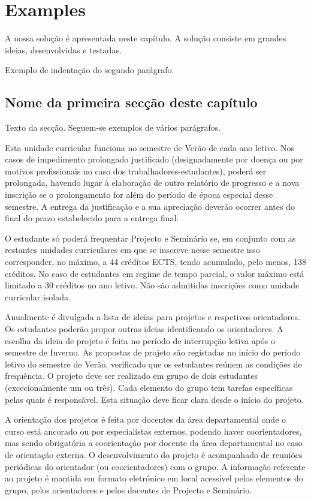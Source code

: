 \chapter{Examples}\label{ch:examples}

A nossa solução é apresentada neste capítulo. A solução consiste em grandes ideias, desenvolvidas e testadas.

Exemplo de indentação do segundo parágrafo.


\section{Nome da primeira secção deste capítulo} \label{sec31}
Texto da secção. Seguem-se exemplos de vários parágrafos.

Esta unidade curricular funciona no semestre de Verão de cada ano letivo. Nos casos de impedimento prolongado justificado (designadamente por doença ou por motivos profissionais no caso dos trabalhadores-estudantes), poderá ser prolongada, havendo lugar à elaboração de outro relatório de progresso
e a nova inscrição se o prolongamento for além do período de época especial desse semestre. A entrega da justificação e a sua apreciação deverão ocorrer antes do final do prazo estabelecido para a entrega final.

O estudante só poderá frequentar Projecto e Seminário se, em conjunto com as restantes unidades curriculares em que se inscreve nesse semestre isso corresponder, no máximo, a 44 créditos ECTS, tendo acumulado, pelo menos, 138 créditos. No caso de estudantes em regime de tempo parcial, o valor máximo
está limitado a 30 créditos no ano letivo. Não são admitidas inscrições como unidade curricular isolada.

Anualmente é divulgada a lista de ideias para projetos e respetivos orientadores. Os estudantes poderão propor outras ideias identificando os orientadores. A escolha da ideia de projeto é feita no período de
interrupção letiva após o semestre de Inverno. As propostas de projeto são registadas no início do período letivo do semestre de Verão, verificado que os estudantes reúnem as condições de frequência.
O projeto deve ser realizado em grupo de dois estudantes (excecionalmente um ou três). Cada elemento do grupo tem tarefas específicas pelas quais é responsável. Esta situação deve ficar clara desde o início do projeto.

A orientação dos projetos é feita por docentes da área departamental onde o curso está ancorado ou por especialistas externos, podendo haver coorientadores, mas sendo obrigatória a coorientação por docente da área departamental no caso de orientação externa. O desenvolvimento do projeto é acompanhado de reuniões periódicas do orientador (ou coorientadores) com o grupo. A informação referente ao projeto é mantida em formato eletrónico em local acessível pelos elementos do grupo, pelos orientadores e pelos docentes de Projecto e Seminário.\\

